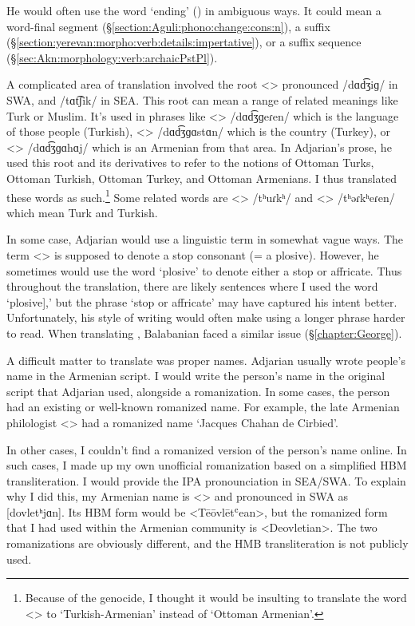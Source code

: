 He would often use the word `ending'  () in ambiguous ways. It could mean a word-final segment (\S\ref{section:Aguli:phono:change:cons:n}), a suffix (\S\ref{section:yerevan:morpho:verb:details:impertative}), or a suffix sequence (\S\ref{sec:Akn:morphology:verb:archaicPstPl}). 

A complicated area of translation involved the root <> pronounced /dɑd͡ʒiɡ/ in SWA, and /tɑt͡ʃik/ in SEA. This root can mean a range of related meanings like Turk or Muslim. It's used in phrases like <> /dɑd͡ʒɡeɾen/ which is the language of those people (Turkish), <> /dɑd͡ʒɡɑstɑn/ which is the country (Turkey), or <> /dɑd͡ʒɡɑhɑj/ which is an Armenian from that area. In Adjarian's prose, he used this root and its derivatives to refer to the notions of  Ottoman Turks, Ottoman Turkish, Ottoman Turkey, and Ottoman Armenians. I thus translated these words as such.\footnote{Because of the genocide, I thought it would be insulting to translate the word  <> to `Turkish-Armenian' instead of `Ottoman Armenian'.} Some related words are <> /tʰuɾkʰ/ and <> /tʰəɾkʰeɾen/ which mean Turk and Turkish. 

In some case, Adjarian would use a linguistic term in somewhat vague ways. The term <> is supposed to denote a stop consonant (= a plosive). However, he sometimes would use the word `plosive' to denote either a stop or affricate. Thus throughout the translation, there are likely sentences where I used the word `plosive],' but the phrase `stop  or affricate' may have captured his intent better. Unfortunately, his style of writing would often make using a longer phrase harder to read.  When translating \citet{Adjarian-1899-ArmenianExplosives}, Balabanian faced a similar issue (\S\ref{chapter:George}). 

A difficult matter to translate was proper names. Adjarian usually wrote people's name in the Armenian script. I would write the person's name in the original script that Adjarian used, alongside a romanization. In some cases, the person had an existing or well-known romanized name. For example, the late Armenian philologist <> had a romanized name `Jacques Chahan de Cirbied'. 

In other cases, I couldn't find a romanized version of the  person's name online. In such cases, I made up my own unofficial romanization based on a simplified HBM transliteration. I would provide  the IPA pronounciation in SEA/SWA.  To explain why I did this, my Armenian name is <> and pronounced in SWA as [dovletʰjɑn]. Its HBM form would be <Tēōvlētʿean>, but the romanized form that I had used within the Armenian community is <Deovletian>.  The two romanizations are obviously different, and the HMB transliteration is not publicly used.

